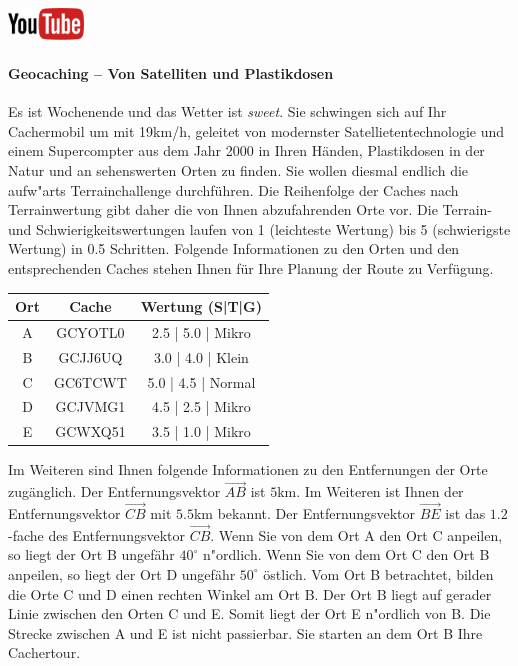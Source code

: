 \documentclass[a4paper, 10pt]{scrartcl}\usepackage[]{graphicx}\usepackage[]{xcolor}
\begin{document}
\hfill\href{https://youtu.be/3LAq3R0rS14}{\includegraphics[width =
  2cm]{img/youtube}} %
\hspace{2Ex}

\paragraph{Geocaching -- Von Satelliten und Plastikdosen}



Es ist Wochenende und das Wetter ist \textit{sweet}. Sie schwingen sich auf
Ihr Cachermobil um mit 19km/h, geleitet von modernster
Satellietentechnologie und einem Supercompter aus dem Jahr 2000 in Ihren
H{\"a}nden, Plastikdosen in der Natur und an sehenswerten Orten zu finden. Sie
wollen diesmal endlich die aufw{"a}rts Terrainchallenge
durchf{\"u}hren. Die Reihenfolge der Caches nach Terrainwertung gibt daher
die von Ihnen abzufahrenden Orte vor. Die Terrain- und
Schwierigkeitswertungen laufen von 1 (leichteste Wertung) bis 5
(schwierigste Wertung) in 0.5 Schritten. Folgende Informationen zu den
Orten und den entsprechenden Caches stehen Ihnen f{\"u}r Ihre Planung der Route
zu Verf{\"u}gung.

\begin{center}
  \begin{tabular}{ ccc }
    \toprule
    Ort & Cache & Wertung (S|T|G) \\
    \midrule
    A & GCYOTL0 & 2.5 | 5.0 | Mikro \\
    B & GCJJ6UQ & 3.0 | 4.0 | Klein \\ 
    C & GC6TCWT & 5.0 | 4.5 | Normal \\ 
    D & GCJVMG1 & 4.5 | 2.5 | Mikro \\ 
    E & GCWXQ51 & 3.5 | 1.0 | Mikro \\     
 \bottomrule
\end{tabular}
\end{center}

Im Weiteren sind Ihnen folgende Informationen zu den Entfernungen der Orte
zug{\"a}nglich. Der Entfernungsvektor $\overrightarrow{AB}$ ist
$5$km. Im Weiteren ist Ihnen der Entfernungsvektor
$\overrightarrow{CB}$ mit $5.5$km bekannt. Der
Entfernungsvektor $\overrightarrow{BE}$ ist das $1.2$-fache
des Entfernungsvektor $\overrightarrow{CB}$. Wenn Sie von dem Ort A den Ort
C anpeilen, so liegt der Ort B ungef{\"a}hr $40^\circ$
n{"o}rdlich. Wenn Sie von dem Ort C den Ort B anpeilen, so liegt
der Ort D ungef{\"a}hr $50^\circ$ {\"o}stlich. Vom Ort B
betrachtet, bilden die Orte C und D einen rechten Winkel am Ort B. Der Ort
B liegt auf gerader Linie zwischen den Orten C und E. Somit liegt der Ort E
n{"o}rdlich von B. Die Strecke zwischen A und E ist nicht
passierbar. Sie starten an dem Ort B Ihre Cachertour. \\
\end{document}
